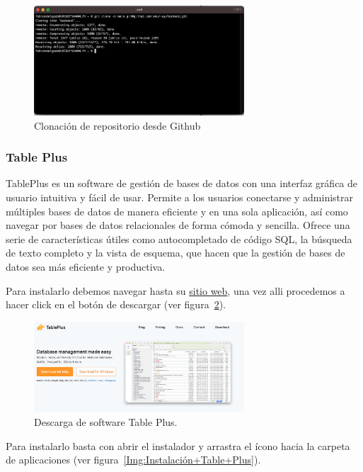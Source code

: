 \begin{figure}[h]
    \centering
    \includegraphics[width=0.7\textwidth]{img/manual/git-clonado.png}
    \caption{Clonación de repositorio desde Github} \label{Img:Clonación+de+repositorio+desde Github}
\end{figure} 


\subsubsection{Table Plus}\label{table-plus}
TablePlus es un software de gestión de bases de datos con una interfaz gráfica de usuario intuitiva y fácil de usar. Permite a los usuarios conectarse y administrar múltiples bases de datos de manera eficiente y en una sola aplicación, así como navegar por bases de datos relacionales de forma cómoda y sencilla. Ofrece una serie de características útiles como autocompletado de código SQL, la búsqueda de texto completo y la vista de esquema, que hacen que la gestión de bases de datos sea más eficiente y productiva. 

Para instalarlo debemos navegar hasta su \href{https://tableplus.com/}{sitio web}, una vez alli procedemos a hacer click en el botón de descargar (ver figura~\ref{Img:Descarga+de+software+Table+Plus}).

\begin{figure}[h]
    \centering
    \includegraphics[width=0.7\textwidth]{img/manual/table-plus.png}
    \caption{Descarga de software Table Plus.} \label{Img:Descarga+de+software+Table+Plus}
\end{figure} 

Para instalarlo basta con abrir el instalador y arrastra el ícono hacia la carpeta de aplicaciones (ver figura~\ref{Img:Instalación+Table+Plus}).

